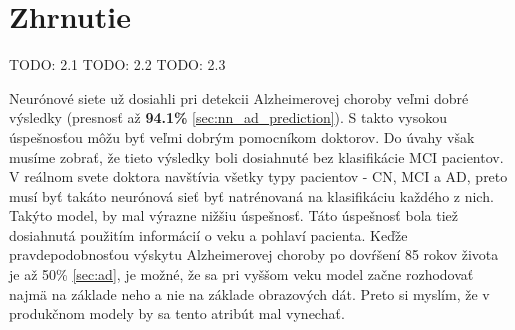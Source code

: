 



\section{Zhrnutie}

TODO: 2.1
TODO: 2.2
TODO: 2.3

Neurónové siete už dosiahli pri detekcii Alzheimerovej choroby veľmi dobré výsledky (presnosť až \textbf{94.1\%} \ref{sec:nn_ad_prediction}). S takto vysokou úspešnosťou môžu byť veľmi dobrým pomocníkom doktorov. Do úvahy však musíme zobrať, že tieto výsledky boli dosiahnuté bez klasifikácie MCI pacientov. V reálnom svete doktora navštívia všetky typy pacientov - CN, MCI a AD, preto musí byť takáto neurónová sieť byť natrénovaná na klasifikáciu každého z nich. Takýto model, by mal výrazne nižšiu úspešnosť. Táto úspešnosť bola tiež dosiahnutá použitím informácií o veku a pohlaví pacienta. Keďže pravdepodobnosťou výskytu Alzheimerovej choroby po dovŕšení 85 rokov života je až 50\% \ref{sec:ad}, je možné, že sa pri vyššom veku model začne rozhodovať najmä na základe neho a nie na základe obrazových dát. Preto si myslím, že v produkčnom modely by sa tento atribút mal vynechať. 

